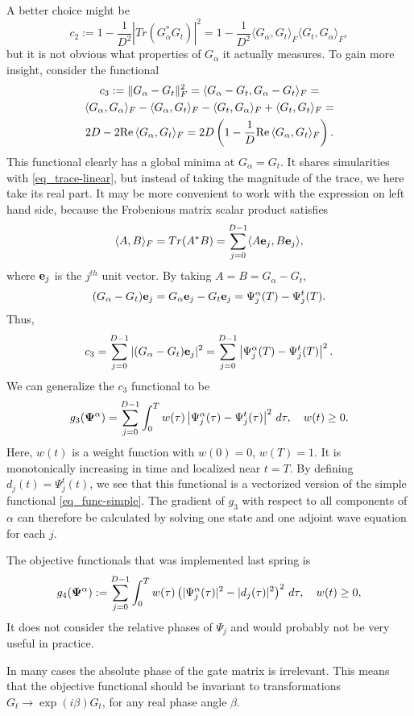 \documentclass[11pt]{article}
\begin{document}
A better choice might be
\begin{equation}\label{eq_trace-squared}
c_2 := 1 - \frac{1}{D^2} |Tr (G_\alpha^* G_t)|^2 = 1 - \frac{1}{D^2} \langle G_\alpha, G_t \rangle_F
\langle G_t,  G_\alpha \rangle_F,
\end{equation}
but it is not obvious what properties of $G_\alpha$ it actually measures. To gain more insight,
consider the functional
\begin{multline}\label{eq_trace-real}
  c_3 := \| G_\alpha-G_t \|_F^2 = \langle G_\alpha-G_t, G_\alpha-G_t \rangle_F = \\
  \langle G_\alpha, G_\alpha \rangle_F - \langle G_\alpha, G_t \rangle_F  -
  \langle G_t, G_\alpha \rangle_F + \langle G_t, G_t \rangle_F =\\
  2D - 2{\rm Re}\, \langle G_\alpha, G_t \rangle_F = 2D\left( 1 - \frac{1}{D} {\rm Re}\, \langle
  G_\alpha, G_t \rangle_F\right). 
\end{multline}
This functional clearly has a global minima at $G_\alpha=G_t$. It shares simularities with
\eqref{eq_trace-linear}, but instead of taking the magnitude of the trace, we here take its real
part. It may be more convenient to work with the expression on left hand
side, because the Frobenious matrix scalar product satisfies
\[
\langle A, B \rangle_F = Tr(A^* B) = \sum_{j=0}^{D-1} \langle A{\mathbf e}_j, B{\mathbf e}_j\rangle,
\]
where ${\mathbf e}_j$ is the $j^{th}$ unit vector. By taking $A=B=G_\alpha - G_t$,
\[
(G_\alpha - G_t){\mathbf e}_j = G_\alpha{\mathbf e}_j - G_t{\mathbf e}_j = \Psi_j^\alpha(T) - \Psi_j^t(T).
\]
Thus,
\[
c_3 = \sum_{j=0}^{D-1} |(G_\alpha - G_t){\mathbf e}_j|^2 = \sum_{j=0}^{D-1} \left| \Psi_j^\alpha(T) -
\Psi_j^t(T) \right|^2.
\]
We can generalize the $c_3$ functional to be
\begin{equation}
g_3({\mathbf \Psi}^\alpha) =  \sum_{j=0}^{D-1} \int_0^T w(\tau) \left| \Psi_j^\alpha(\tau) - \Psi_j^t(\tau)
\right|^2\, d\tau,\quad w(t) \geq 0. 
\end{equation}
Here, $w(t)$ is a weight function with $w(0)=0$, $w(T)=1$. It is monotonically increasing in time
and localized near $t=T$. By defining $d_j(t)=\Psi_j^t(t)$, we see that this functional is a
vectorized version of the simple functional \eqref{eq_func-simple}. The gradient of $g_3$ with
respect to all components of $\alpha$ can therefore be calculated by solving one state and one
adjoint wave equation for each $j$.

The objective functionals that was implemented last spring is
\[
g_4({\mathbf \Psi}^\alpha) := \sum_{j=0}^{D-1} \int_0^T w(\tau)  \left( |\Psi^\alpha_j(\tau)|^2 - |d_j(\tau)|^2 \right)^2\,
d\tau,\quad w(t) \geq 0,
\]
It does not consider the relative phases of $\Psi_j$ and would probably not be very useful in practice.

\begin{remark}
In many cases the absolute phase of the gate matrix is irrelevant. This means that the
objective functional should be invariant to transformations $G_t \to \exp(i\beta) G_t$, for any real
phase angle $\beta$.
\end{remark}
\end{document}
